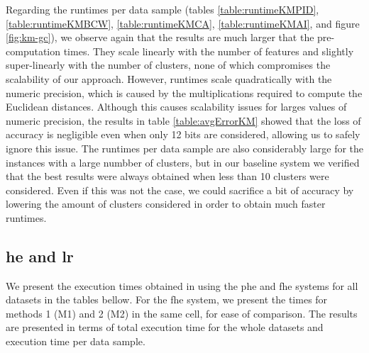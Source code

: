 Regarding the runtimes per data sample (tables \ref{table:runtimeKMPID}, \ref{table:runtimeKMBCW}, \ref{table:runtimeKMCA}, \ref{table:runtimeKMAI}, and figure \ref{fig:km-gc}), we observe again that the results are much larger that the pre-computation times. They scale linearly with the number of features and slightly super-linearly with the number of clusters, none of which compromises the scalability of our approach. However, runtimes scale quadratically with the numeric precision, which is caused by the multiplications required to compute the Euclidean distances. Although this causes scalability issues for larges values of numeric precision, the results in table \ref{table:avgErrorKM} showed that the loss of accuracy is negligible even when only 12 bits are considered, allowing us to safely ignore this issue. The runtimes per data sample are also considerably large for the instances with a large numbber of clusters, but in our baseline system we verified that the best results were always obtained when less than 10 clusters were considered. Even if this was not the case, we could sacrifice a bit of accuracy by lowering the amount of clusters considered in order to obtain much faster runtimes.



\subsection{\acl{he} and \acl{lr}}


We present the execution times obtained in using the \ac{phe} and \ac{fhe} systems for all datasets in the tables bellow. For the \ac{fhe} system, we present the times for methods 1 (M1) and 2 (M2) in the same cell, for ease of comparison. The results are presented in terms of total execution time for the whole datasets and execution time per data sample. 

